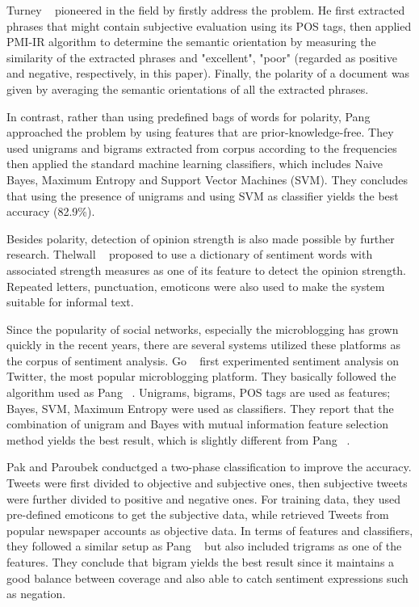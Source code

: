 \documentclass[12pt]{article}
\begin{document}
Turney \etal~\cite{Turney:02} pioneered in the field by firstly address the problem. He first extracted phrases that might contain subjective evaluation using its POS tags, then applied PMI-IR algorithm \cite{Turney:01} to determine the semantic orientation by measuring the similarity of the extracted phrases and "excellent", "poor" (regarded as positive and negative, respectively, in this paper). Finally, the polarity of a document was given by averaging the semantic orientations of all the extracted phrases.

In contrast, rather than using predefined bags of words for polarity, Pang \etal~\cite{Pang:02} approached the problem by using features that are prior-knowledge-free. They used unigrams and bigrams extracted from corpus according to the frequencies then applied the standard machine learning classifiers, which includes Naive Bayes, Maximum Entropy and Support Vector Machines (SVM). They concludes that using the presence of unigrams and using SVM as classifier yields the best accuracy (82.9\%).

Besides polarity, detection of opinion strength is also made possible by further research. Thelwall \etal~\cite{Thelwall:10} proposed to use a dictionary of sentiment words with associated strength measures as one of its feature to detect the opinion strength. Repeated letters, punctuation, emoticons were also used to make the system suitable for informal text.

Since the popularity of social networks, especially the microblogging has grown quickly in the recent years, there are several systems utilized these platforms as the corpus of sentiment analysis. Go \etal~\cite{Go:09} first experimented sentiment analysis on Twitter, the most popular microblogging platform. They basically followed the algorithm used as Pang \etal~\cite{Pang:02}. Unigrams, bigrams, POS tags are used as features; Bayes, SVM, Maximum Entropy were used as classifiers. They report that the combination of unigram and Bayes with mutual information feature selection method yields the best result, which is slightly different from Pang \etal~\cite{Pang:02}.

Pak and Paroubek \cite{Pak:10} conductged a two-phase classification to improve the accuracy. Tweets were first divided to objective and subjective ones, then subjective tweets were further divided to positive and negative ones. For training data, they used pre-defined emoticons to get the subjective data, while retrieved Tweets from popular newspaper accounts as objective data. In terms of features and classifiers, they followed a similar setup as Pang \etal~\cite{Pang:02} but also included trigrams as one of the features. They conclude that bigram yields the best result since it maintains a good balance between coverage and also able to catch sentiment expressions such as negation.
\end{document}
